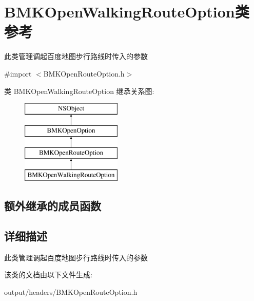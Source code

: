 \hypertarget{interface_b_m_k_open_walking_route_option}{}\section{B\+M\+K\+Open\+Walking\+Route\+Option类 参考}
\label{interface_b_m_k_open_walking_route_option}


此类管理调起百度地图步行路线时传入的参数  




{\ttfamily \#import $<$B\+M\+K\+Open\+Route\+Option.\+h$>$}

类 B\+M\+K\+Open\+Walking\+Route\+Option 继承关系图\+:\begin{figure}[H]
\begin{center}
\leavevmode
\includegraphics[height=4.000000cm]{interface_b_m_k_open_walking_route_option}
\end{center}
\end{figure}
\subsection*{额外继承的成员函数}


\subsection{详细描述}
此类管理调起百度地图步行路线时传入的参数 

该类的文档由以下文件生成\+:\begin{DoxyCompactItemize}
\item 
output/headers/B\+M\+K\+Open\+Route\+Option.\+h\end{DoxyCompactItemize}
